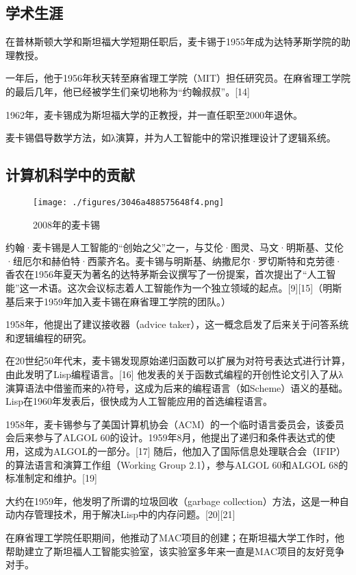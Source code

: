 \subsection{学术生涯}

在普林斯顿大学和斯坦福大学短期任职后，麦卡锡于1955年成为达特茅斯学院的助理教授。

一年后，他于1956年秋天转至麻省理工学院（MIT）担任研究员。在麻省理工学院的最后几年，他已经被学生们亲切地称为“约翰叔叔”。[14]

1962年，麦卡锡成为斯坦福大学的正教授，并一直任职至2000年退休。

麦卡锡倡导数学方法，如λ演算，并为人工智能中的常识推理设计了逻辑系统。
\subsection{计算机科学中的贡献}
\begin{figure}[ht]
\centering
\texttt{[image: ./figures/3046a488575648f4.png]}
\caption{2008年的麦卡锡} \label{fig_YHMKX_2}
\end{figure}
约翰·麦卡锡是人工智能的“创始之父”之一，与艾伦·图灵、马文·明斯基、艾伦·纽厄尔和赫伯特·西蒙齐名。麦卡锡与明斯基、纳撒尼尔·罗切斯特和克劳德·香农在1956年夏天为著名的达特茅斯会议撰写了一份提案，首次提出了“人工智能”这一术语。这次会议标志着人工智能作为一个独立领域的起点。[9][15]（明斯基后来于1959年加入麦卡锡在麻省理工学院的团队。）

1958年，他提出了建议接收器（advice taker），这一概念启发了后来关于问答系统和逻辑编程的研究。

在20世纪50年代末，麦卡锡发现原始递归函数可以扩展为对符号表达式进行计算，由此发明了Lisp编程语言。[16] 他发表的关于函数式编程的开创性论文引入了从λ演算语法中借鉴而来的λ符号，这成为后来的编程语言（如Scheme）语义的基础。Lisp在1960年发表后，很快成为人工智能应用的首选编程语言。

1958年，麦卡锡参与了美国计算机协会（ACM）的一个临时语言委员会，该委员会后来参与了ALGOL 60的设计。1959年8月，他提出了递归和条件表达式的使用，这成为ALGOL的一部分。[17] 随后，他加入了国际信息处理联合会（IFIP）的算法语言和演算工作组（Working Group 2.1），参与ALGOL 60和ALGOL 68的标准制定和维护。[19]

大约在1959年，他发明了所谓的垃圾回收（garbage collection）方法，这是一种自动内存管理技术，用于解决Lisp中的内存问题。[20][21]

在麻省理工学院任职期间，他推动了MAC项目的创建；在斯坦福大学工作时，他帮助建立了斯坦福人工智能实验室，该实验室多年来一直是MAC项目的友好竞争对手。

